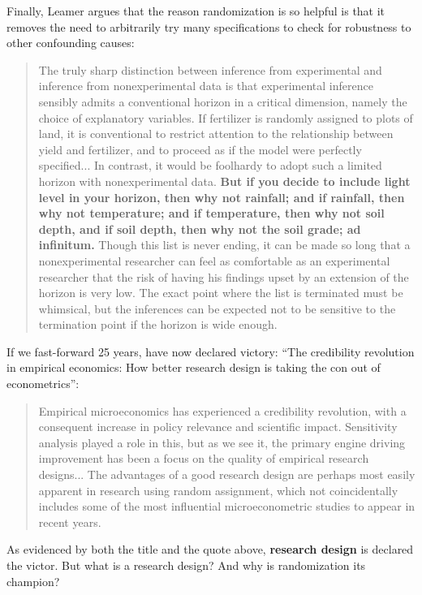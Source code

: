 \documentclass{tufte-handout}
\theoremstyle{break}
\begin{document}
Finally, Leamer argues that the reason randomization is so helpful is that it removes the need to arbitrarily try many specifications to check for robustness to other confounding causes:

\begin{quote}
  The truly sharp distinction between inference from experimental and inference from nonexperimental data is that experimental inference sensibly admits a conventional horizon in a critical dimension, namely the choice of explanatory variables. If fertilizer is randomly assigned to plots of land, it is conventional to restrict attention to the relationship between yield and fertilizer, and to proceed as if the model were perfectly specified... In contrast, it would be foolhardy to adopt such a limited horizon with nonexperimental data. \textbf{But if you decide to include light level in your horizon, then why not rainfall; and if rainfall, then why not temperature; and if temperature, then why not soil depth, and if soil depth, then why not the soil grade; ad infinitum.} Though this list is never ending, it can be made so long that a nonexperimental researcher can feel as comfortable as an experimental researcher that the risk of having his findings upset by an extension of the horizon is very low. The exact point where the list is terminated must be whimsical, but the inferences can be expected not to be sensitive to the termination point if the horizon is wide enough.
\end{quote}

If we fast-forward 25 years, \citet{angrist2010credibility} have now declared victory: ``The credibility revolution in empirical economics: How better research design is taking the con out of econometrics'':
\begin{quote}
  Empirical microeconomics has experienced a credibility revolution, with a consequent increase in policy relevance and scientific impact. Sensitivity analysis played a role in this, but as we see it, the primary engine driving improvement has been a focus on the quality of empirical research designs...
  The advantages of a good research design are perhaps most easily apparent in research using random assignment, which not coincidentally includes some of the most influential microeconometric studies to appear in recent years.
\end{quote}

As evidenced by both the title and the quote above, \textbf{research design} is declared the victor. But what is a research design? And why is randomization its champion?
\end{document}
